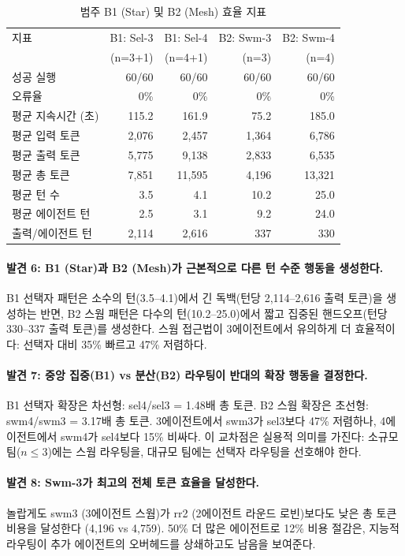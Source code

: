 \documentclass[a4paper,11pt]{article}
\begin{document}
\begin{table}[H]
\centering
\caption{범주 B1 (Star) 및 B2 (Mesh) 효율 지표}
\label{tab:cat-b}
{\small
\begin{tabular}{lrrrr}
\toprule
지표 & B1: Sel-3 & B1: Sel-4 & B2: Swm-3 & B2: Swm-4 \\
    & (n=3+1)   & (n=4+1)   & (n=3)     & (n=4)     \\
\midrule
성공 실행       & 60/60 & 60/60 & 60/60 & 60/60 \\
오류율           & 0\% & 0\% & 0\% & 0\% \\
평균 지속시간 (초) & 115.2 & 161.9 & 75.2 & 185.0 \\
평균 입력 토큰   & 2,076 & 2,457 & 1,364 & 6,786 \\
평균 출력 토큰   & 5,775 & 9,138 & 2,833 & 6,535 \\
평균 총 토큰     & 7,851 & 11,595 & 4,196 & 13,321 \\
평균 턴 수       & 3.5 & 4.1 & 10.2 & 25.0 \\
평균 에이전트 턴 & 2.5 & 3.1 & 9.2 & 24.0 \\
출력/에이전트 턴 & 2,114 & 2,616 & 337 & 330 \\
\bottomrule
\end{tabular}
}
\end{table}

\paragraph{발견 6: B1 (Star)과 B2 (Mesh)가 근본적으로 다른 턴 수준 행동을 생성한다.}
B1 선택자 패턴은 소수의 턴(3.5--4.1)에서 긴 독백(턴당 2,114--2,616 출력 토큰)을 생성하는 반면, B2 스웜 패턴은 다수의 턴(10.2--25.0)에서 짧고 집중된 핸드오프(턴당 330--337 출력 토큰)를 생성한다. 스웜 접근법이 3에이전트에서 유의하게 더 효율적이다: 선택자 대비 35\% 빠르고 47\% 저렴하다.

\paragraph{발견 7: 중앙 집중(B1) vs 분산(B2) 라우팅이 반대의 확장 행동을 결정한다.}
B1 선택자 확장은 차선형: sel4/sel3 = 1.48배 총 토큰. B2 스웜 확장은 초선형: swm4/swm3 = 3.17배 총 토큰. 3에이전트에서 swm3가 sel3보다 47\% 저렴하나, 4에이전트에서 swm4가 sel4보다 15\% 비싸다. 이 교차점은 실용적 의미를 가진다: 소규모 팀($n \leq 3$)에는 스웜 라우팅을, 대규모 팀에는 선택자 라우팅을 선호해야 한다.

\paragraph{발견 8: Swm-3가 최고의 전체 토큰 효율을 달성한다.}
놀랍게도 swm3 (3에이전트 스웜)가 rr2 (2에이전트 라운드 로빈)보다도 낮은 총 토큰 비용을 달성한다 (4,196 vs 4,759). 50\% 더 많은 에이전트로 12\% 비용 절감은, 지능적 라우팅이 추가 에이전트의 오버헤드를 상쇄하고도 남음을 보여준다.
\end{document}
